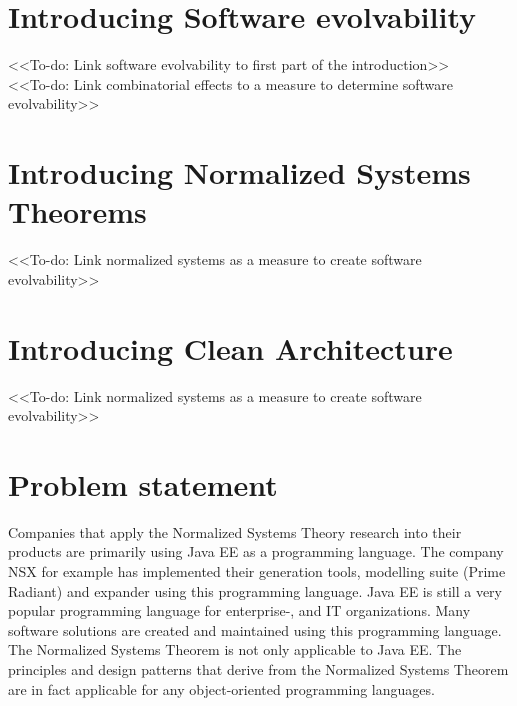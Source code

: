 \section{Introducing Software evolvability}
<<To-do: Link software evolvability to first part of the introduction>>\\
<<To-do: Link combinatorial effects to a measure to determine software evolvability>>

\section{Introducing Normalized Systems Theorems}
<<To-do: Link normalized systems as a measure to create software evolvability>>

\section{Introducing Clean Architecture}
<<To-do: Link normalized systems as a measure to create software evolvability>>

\section{Problem statement} \label{problem_statement}

Companies that apply the Normalized Systems Theory research into their products are
primarily using Java EE as a programming language. The company NSX
 for example has implemented their
generation tools, modelling suite (Prime Radiant) and expander using this programming
language. Java EE is still a very popular programming language for enterprise-, and IT
organizations. Many software solutions are created and maintained using this programming
language. The Normalized Systems Theorem is not only applicable to Java EE. The principles
and design patterns that derive from the Normalized Systems Theorem are in fact applicable
for any object-oriented programming languages. 


